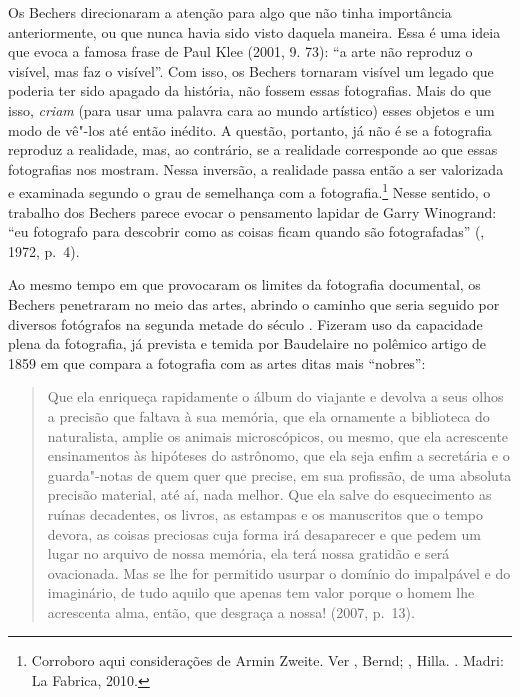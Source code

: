 Os Bechers direcionaram a atenção para algo que não tinha importância
anteriormente, ou que nunca havia sido visto daquela maneira. Essa é uma
ideia que evoca a famosa frase de Paul Klee (2001, 9. 73): ``a arte não
reproduz o visível, mas faz o visível''. Com isso, os Bechers tornaram
visível um legado que poderia ter sido apagado da história, não fossem
essas fotografias. Mais do que isso, \emph{criam} (para usar uma palavra
cara ao mundo artístico) esses objetos e um modo de vê"-los até então
inédito. A questão, portanto, já não é se a fotografia reproduz a
realidade, mas, ao contrário, se a realidade corresponde ao que essas
fotografias nos mostram. Nessa inversão, a realidade passa então a ser
valorizada e examinada segundo o grau de semelhança com a
fotografia.\footnote{Corroboro aqui considerações de Armin Zweite. Ver
  , Bernd; , Hilla. {}. Madri: La Fabrica, 2010.}
Nesse sentido, o trabalho dos Bechers parece evocar o pensamento lapidar
de Garry Winogrand: ``eu fotografo para descobrir como as coisas ficam
quando são fotografadas'' (, 1972, p.~4).

Ao mesmo tempo em que provocaram os limites da fotografia documental, os
Bechers penetraram no meio das artes, abrindo o caminho que seria
seguido por diversos fotógrafos na segunda metade do século . Fizeram
uso da capacidade plena da fotografia, já prevista e temida por
Baudelaire no polêmico artigo de 1859 em que compara a
fotografia com as artes ditas mais ``nobres'':

\begin{quote}
Que ela enriqueça rapidamente o álbum do viajante e devolva a seus olhos
a precisão que faltava à sua memória, que ela ornamente a biblioteca do
naturalista, amplie os animais microscópicos, ou mesmo, que ela
acrescente ensinamentos às hipóteses do astrônomo, que ela seja enfim a
secretária e o guarda"-notas de quem quer que precise, em sua profissão,
de uma absoluta precisão material, até aí, nada melhor. Que ela salve do
esquecimento as ruínas decadentes, os livros, as estampas e os
manuscritos que o tempo devora, as coisas preciosas cuja forma irá
desaparecer e que pedem um lugar no arquivo de nossa memória, ela terá
nossa gratidão e será ovacionada. Mas se lhe for permitido usurpar o
domínio do impalpável e do imaginário, de tudo aquilo que apenas tem
valor porque o homem lhe acrescenta alma, então, que desgraça a nossa!
(2007, p.~13).
\end{quote}


